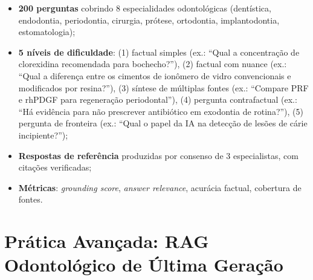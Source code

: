 \begin{itemize}
    \item \textbf{200 perguntas} cobrindo 8 especialidades odontológicas (dentística, endodontia, periodontia, cirurgia, prótese, ortodontia, implantodontia, estomatologia);
    \item \textbf{5 níveis de dificuldade}: (1) factual simples (ex.: ``Qual a concentração de clorexidina recomendada para bochecho?''), (2) factual com nuance (ex.: ``Qual a diferença entre os cimentos de ionômero de vidro convencionais e modificados por resina?''), (3) síntese de múltiplas fontes (ex.: ``Compare PRF e rhPDGF para regeneração periodontal''), (4) pergunta contrafactual (ex.: ``Há evidência para não prescrever antibiótico em exodontia de rotina?''), (5) pergunta de fronteira (ex.: ``Qual o papel da IA na detecção de lesões de cárie incipiente?'');

    \item \textbf{Respostas de referência} produzidas por consenso de 3 especialistas, com citações verificadas;

    \item \textbf{Métricas}: \textit{grounding score}, \textit{answer relevance}, acurácia factual, cobertura de fontes.
\end{itemize}

\section{Prática Avançada: RAG Odontológico de Última Geração}

